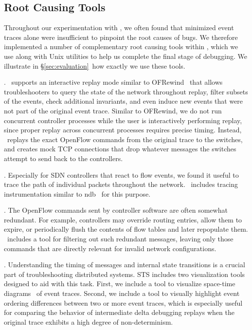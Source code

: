 \subsection{Root Causing Tools}
\label{subsec:root_causing}

Throughout our experimentation with \projectname, we often found that
minimized event traces alone were insufficient to
pinpoint the root causes of bugs. We therefore implemented a number of
complementary root
causing tools within \projectname,
which we use along with Unix utilities to help us complete the final
stage of debugging. We illustrate in \S\ref{sec:evaluation}~how exactly we use
these tools.

. \projectname~supports an interactive replay mode
similar to OFRewind~\cite{ofrewind} that allows troubleshooters to query the
state of the network throughout replay, filter subsets of the events, check
additional invariants, and
even induce new events that were not part of the original event trace.
Similar to OFRewind, we do not run concurrent controller processes while the
user is interactively performing replay, since proper replay across
concurrent processes requires precise timing.
Instead, \projectname~replays the exact OpenFlow commands from the
original trace to the switches, and creates mock TCP connections that drop
whatever messages the switches attempt to send back to the controllers.

. Especially for SDN controllers that react to
flow events, we found it useful to trace the path of individual
packets throughout the network. \projectname~includes tracing instrumentation
similar to ndb~\cite{ndb14} for this purpose.

. The OpenFlow commands sent by controller software
are often somewhat redundant. For example, controllers may override routing
entries, allow them to expire, or periodically flush the
contents of flow tables and later repopulate them. \projectname~includes a
tool for filtering out such redundant messages,
leaving only those commands that are directly relevant for invalid network
configurations.

. Understanding the timing of messages and internal
state transitions is a crucial part of troubleshooting distributed systems.
STS includes two visualization tools designed to aid with this task. First, we
include a tool to visualize space-time diagrams~\cite{Lamport:1978:TCO:359545.359563}
of event traces.
Second, we include a tool to visually highlight event ordering differences
between two or more event traces, which is especially useful for comparing the behavior of
intermediate delta debugging replays when the original trace exhibits a high degree of non-determinism.

